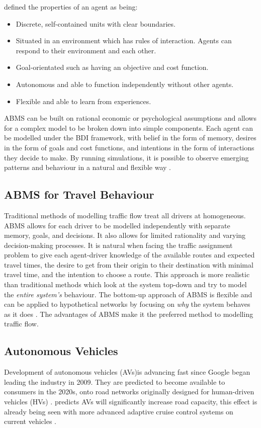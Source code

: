 \documentclass[12pt, a4paper, onecolumn]{article}
\begin{document}
\cite{Macal2005} defined the properties of an agent as being:
\begin{itemize}
\item{Discrete, self-contained units with clear boundaries.}
\item{Situated in an environment which has rules of interaction. Agents can respond to their environment and each other.}
\item{Goal-orientated such as having an objective and cost function.}
\item{Autonomous and able to function independently without other agents.}
\item{Flexible and able to learn from experiences.}
\end{itemize}

ABMS can be built on rational economic or psychological assumptions and allows for a complex model to be broken down into simple components. Each agent can be modelled under the BDI framework, with belief in the form of memory, desires in the form of goals and cost functions, and intentions in the form of interactions they decide to make. By running simulations, it is possible to observe emerging patterns and behaviour in a natural and flexible way \citep{Bonabeau2002}.

\subsection{ABMS for Travel Behaviour}
Traditional methods of modelling traffic flow treat all drivers at homogeneous. ABMS allows for each driver to be modelled independently with separate memory, goals, and decisions. It also allows for limited rationality and varying decision-making processes. It is natural when facing the traffic assignment problem to give each agent-driver knowledge of the available routes and expected travel times, the desire to get from their origin to their destination with minimal travel time, and the intention to choose a route. This approach is more realistic than traditional methods which look at the system top-down and try to model the \textit{entire system's} behaviour. The bottom-up approach of ABMS is flexible and can be applied to hypothetical networks by focusing on \textit{why} the system behaves as it does \citep{Zheng2013}. The advantages of ABMS make it the preferred method to modelling traffic flow.

\subsection{Autonomous Vehicles}
Development of autonomous vehicles (AVs)is advancing fast since Google began leading the industry in 2009. They are predicted to become available to consumers in the 2020s, onto road networks originally designed for human-driven vehicles (HVs) \citep{Bert2015}. \cite{Acker2012} predicts AVs will significantly increase road capacity, this effect is already being seen with more advanced adaptive cruise control systems on current vehicles \citep{Ntous2015}.
\end{document}
